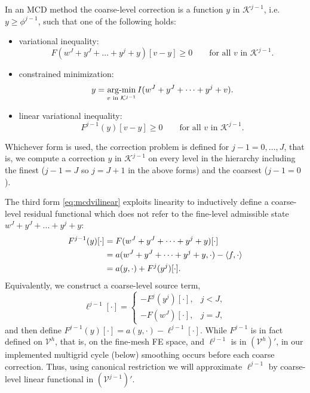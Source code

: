 \documentclass[letterpaper,final,12pt,reqno]{amsart}
\theoremstyle{claim}
\newcommand{\ip}[2]{\left<#1,#2\right>}
\numberwithin{equation}{section}
\numberwithin{figure}{section}
\numberwithin{table}{section}
\numberwithin{theorem}{section}
\begin{document}
In an MCD method the coarse-level correction is a function $y$ in $\mathcal{K}^{j-1}$, i.e.~$y \ge \phi^{j-1}$, such that one of the following holds:
\begin{itemize}
\item variational inequality:
\begin{equation}
  F(w^J+y^J+\dots+y^j+y)[v - y] \ge 0 \qquad \text{for all } v \text{ in } \mathcal{K}^{j-1}.  \label{eq:mcdvi}
\end{equation}
\item constrained minimization:
\begin{equation}
  y = \mathop{\mathrm{arg\text{-}min}}_{v \text{ in } \mathcal{K}^{j-1}} I(w^J+y^J+\dots+y^j+v).  \label{eq:mcdminimization}
\end{equation}
\item linear variational inequality:
\begin{equation}
  F^{j-1}(y)[v - y] \ge 0 \qquad \text{for all } v \text{ in } \mathcal{K}^{j-1}.   \label{eq:mcdvilinear}
\end{equation}
\end{itemize}
Whichever form is used, the correction problem is defined for $j-1=0,\dots,J$, that is, we compute a correction $y$ in $\mathcal{K}^{j-1}$ on every level in the hierarchy including the finest ($j-1=J$ so $j=J+1$ in the above forms) and the coarsest ($j-1=0$).

The third form \eqref{eq:mcdvilinear} exploits linearity to inductively define a coarse-level residual functional which does not refer to the fine-level admissible state $w^J+y^J+\dots+y^j+y$:
\begin{align}
  F^{j-1}(y)[\cdot] &= F(w^J+y^J+\dots+y^j+y)[\cdot] \label{eq:residuallinearlevel} \\
                    &= a(w^J+y^J+\dots+y^j+y,\cdot) - \ip{f}{\cdot} \notag \\
                    &= a(y,\cdot) + F^j(y^j)[\cdot]. \notag
\end{align}
Equivalently, we construct a coarse-level source term,
\begin{equation}
  \ell^{j-1}[\cdot] = \begin{cases} - F^j(y^j)[\cdot], & j < J, \\
                                    - F(w^J)[\cdot],   & j = J, \end{cases} \label{eq:rhslinearlevel}
\end{equation}
and then define $F^{j-1}(y)[\cdot] = a(y,\cdot) - \ell^{j-1}[\cdot]$.  While $F^{j-1}$ is in fact defined on $\mathcal{V}^h$, that is, on the fine-mesh FE space, and $\ell^{j-1}$ is in $(\mathcal{V}^h)'$, in our implemented multigrid cycle (below) smoothing occurs before each coarse correction.  Thus, using canonical restriction we will approximate $\ell^{j-1}$ by coarse-level linear functional in $(\mathcal{V}^{j-1})'$.
\end{document}
